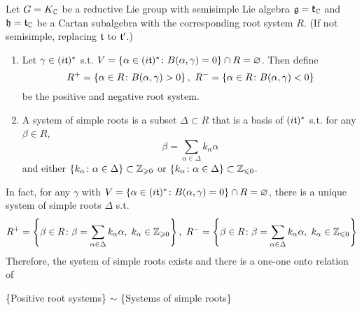 \documentclass[a4paper,12pt]{article}
\begin{document}
	\begin{defn}
		Let $G = K_{\mathbb{C}}$ be a reductive Lie group with semisimple Lie algebra $\mathfrak{g} = \mathfrak{k}_{\mathbb{C}}$ and $\mathfrak{h} = \mathfrak{t}_{\mathbb{C}}$ be a Cartan subalgebra with the corresponding root system $R$. (If not semisimple, replacing $\mathfrak{t}$ to $\mathfrak{t}^{\prime}$.)
		\begin{enumerate}
			\item Let $\gamma \in (i\mathfrak{t})^{*}$ s.t. $V = \left\{\alpha \in (i\mathfrak{t})^{*} \colon B(\alpha,\gamma) = 0\right\} \cap R = \varnothing$. Then define
			\begin{equation*}
				R^{+} = \left\{\alpha \in R \colon B(\alpha, \gamma) > 0\right\},~R^{-} = \left\{\alpha \in R \colon B(\alpha, \gamma) < 0\right\}
			\end{equation*}
			be the positive and negative root system.
			\item A system of simple roots is a subset $\Delta \subset R$ that is a basis of $(i\mathfrak{t})^{*}$ s.t. for any $\beta \in R$,
			\begin{equation*}
				\beta = \sum_{\alpha \in \Delta} k_{\alpha}\alpha
			\end{equation*}
			and either $\left\{k_{\alpha} \colon \alpha \in \Delta\right\} \subset \mathbb{Z}_{\geqslant 0}$ or $\left\{k_{\alpha} \colon \alpha \in \Delta\right\} \subset \mathbb{Z}_{\leqslant 0}$.
		\end{enumerate}
	\end{defn}
	\begin{rem}
		In fact, for any $\gamma$ with $V = \left\{\alpha \in (i\mathfrak{t})^{*} \colon B(\alpha,\gamma) = 0\right\} \cap R = \varnothing$, there is a unique system of simple roots $\Delta$ s.t.
		\begin{equation*}
				R^{+} = \left\{\beta \in R \colon \beta = \sum_{\alpha \in \Delta} k_{\alpha}\alpha,~k_{\alpha} \in \mathbb{Z}_{\geqslant 0}\right\},~R^{-} = \left\{\beta \in R \colon \beta = \sum_{\alpha \in \Delta} k_{\alpha}\alpha,~k_{\alpha} \in \mathbb{Z}_{\leqslant 0}\right\}
		\end{equation*}
		Therefore, the system of simple roots exists and there is a one-one onto relation of
		\begin{center}
			\{Positive root systems\} $\sim$ \{Systems of simple roots\}
		\end{center}
	\end{rem}
\end{document}
